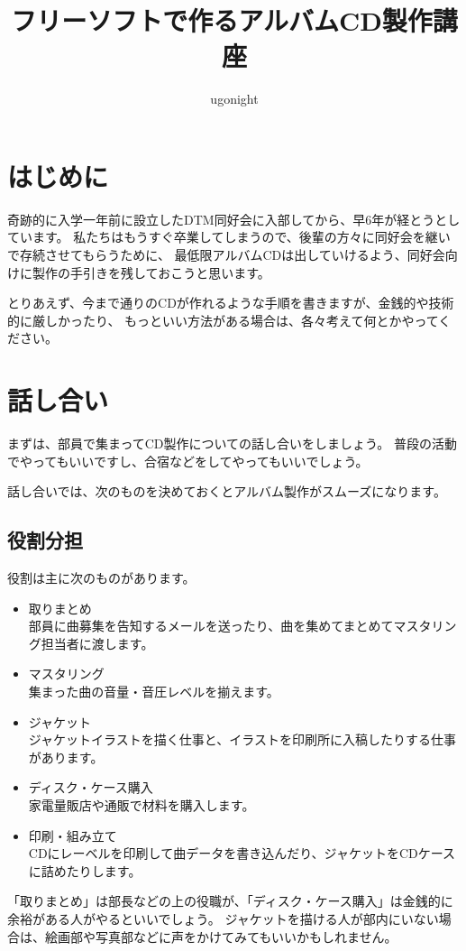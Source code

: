 \documentclass[11pt,a4paper]{jsarticle}
\title{フリーソフトで作るアルバムCD製作講座}
\author{ugonight}
\begin{document}
%
%
    \maketitle

    \section{はじめに}
        奇跡的に入学一年前に設立したDTM同好会に入部してから、早6年が経とうとしています。
        私たちはもうすぐ卒業してしまうので、後輩の方々に同好会を継いで存続させてもらうために、
        最低限アルバムCDは出していけるよう、同好会向けに製作の手引きを残しておこうと思います。
        
        とりあえず、今まで通りのCDが作れるような手順を書きますが、金銭的や技術的に厳しかったり、
        もっといい方法がある場合は、各々考えて何とかやってください。

    \tableofcontents


    \section{話し合い}
        まずは、部員で集まってCD製作についての話し合いをしましょう。
        普段の活動でやってもいいですし、合宿などをしてやってもいいでしょう。

        話し合いでは、次のものを決めておくとアルバム製作がスムーズになります。

        \subsection{役割分担}
            役割は主に次のものがあります。
            \begin{itemize}
                \item 取りまとめ \\
                    部員に曲募集を告知するメールを送ったり、曲を集めてまとめてマスタリング担当者に渡します。
                \item マスタリング \\
                    集まった曲の音量・音圧レベルを揃えます。
                \item ジャケット \\
                    ジャケットイラストを描く仕事と、イラストを印刷所に入稿したりする仕事があります。
                \item ディスク・ケース購入 \\
                    家電量販店や通販で材料を購入します。
                \item 印刷・組み立て \\
                    CDにレーベルを印刷して曲データを書き込んだり、ジャケットをCDケースに詰めたりします。
            \end{itemize}
            「取りまとめ」は部長などの上の役職が、「ディスク・ケース購入」は金銭的に余裕がある人がやるといいでしょう。
            ジャケットを描ける人が部内にいない場合は、絵画部や写真部などに声をかけてみてもいいかもしれません。
            
\end{document}
